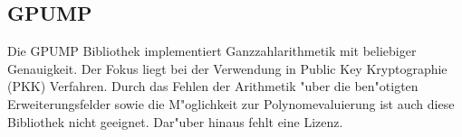 \subsection{GPUMP}
Die GPUMP Bibliothek implementiert Ganzzahlarithmetik mit beliebiger Genauigkeit. Der Fokus liegt bei der Verwendung in Public Key Kryptographie (PKK) Verfahren. Durch das Fehlen der Arithmetik "uber die ben"otigten Erweiterungsfelder sowie die M"oglichkeit zur Polynomevaluierung ist auch diese Bibliothek nicht geeignet. Dar"uber hinaus fehlt eine Lizenz.